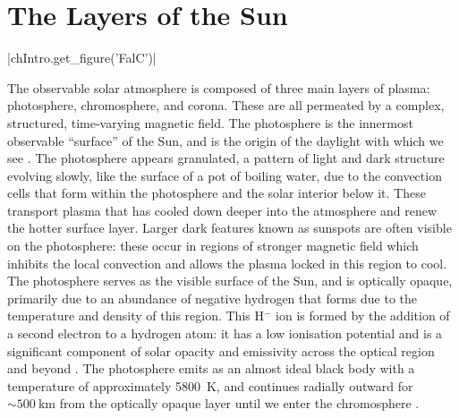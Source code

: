 \section{The Layers of the Sun}

\py[Intro]|chIntro.get_figure('FalC')|

The observable solar atmosphere is composed of three main layers of plasma: photosphere, chromosphere, and corona.
These are all permeated by a complex, structured, time-varying magnetic field.
The photosphere is the innermost observable ``surface'' of the Sun, and is the origin of the daylight with which we see \citep{Zirin1992}.
The photosphere appears granulated, a pattern of light and dark structure evolving slowly, like the surface of a pot of boiling water, due to the convection cells that form within the photosphere and the solar interior below it.
These transport plasma that has cooled down deeper into the atmosphere and renew the hotter surface layer.
Larger dark features known as sunspots are often visible on the photosphere: these occur in regions of stronger magnetic field which inhibits the local convection and allows the plasma locked in this region to cool.
The photosphere serves as the visible surface of the Sun, and is optically opaque, primarily due to an abundance of negative hydrogen that forms due to the temperature and density of this region.
This H$^-$ ion is formed by the addition of a second electron to a hydrogen atom: it has a low ionisation potential and is a significant component of solar opacity and emissivity across the optical region and beyond \citep{Hubeny2014}.
The photosphere emits as an almost ideal black body with a temperature of approximately \SI{5800}{\kelvin}, and continues radially outward for $\sim\SI{500}{\kilo\metre}$ from the optically opaque layer until we enter the chromosphere \citep{Carroll2007}.


